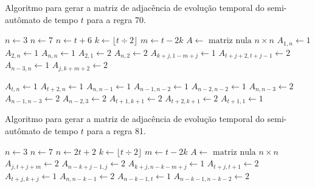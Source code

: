 \documentclass[12pt,a4paper]{article}
\begin{document}
\begin{algorithm}[H]
\caption{Algoritmo para gerar a matriz de adjacência de evolução temporal do
semi-autômato de tempo $t$ para a regra 70.}
\label{alg:r70}
\begin{algorithmic}
    \STATE $n \leftarrow 3$
\ELSE
        \STATE $n \leftarrow 7$
    \ELSE
        \STATE $n \leftarrow t+6$
    \ENDIF
\ENDIF
\STATE $k \leftarrow \lfloor t \div 2 \rfloor$
\STATE $m \leftarrow t - 2k$
\STATE $A \leftarrow \mbox{ matriz nula } n \times n$
    \STATE $A_{1,n} \leftarrow 1$
    \STATE $A_{2,n} \leftarrow 1$
    \STATE $A_{n,n} \leftarrow 1$
    \STATE $A_{2,1} \leftarrow 2$
    \STATE $A_{n,2} \leftarrow 2$
\ELSE
            \STATE $A_{k+j,1-m+j} \leftarrow 1$
        \ENDFOR
            \STATE $A_{t+j+2,t+j-1} \leftarrow 2$
        \ENDFOR
        \STATE $A_{n-3,n} \leftarrow 1$
    \ENDIF
        \STATE $A_{j,k+m+2} \leftarrow 2$
    \ENDFOR
{}
\end{algorithmic}
\end{algorithm}

\begin{algorithm}[H]
\begin{algorithmic}
    \STATE $A_{t,n} \leftarrow 1$
    \STATE $A_{t+2,n} \leftarrow 1$
    \STATE $A_{n,n-1} \leftarrow 1$
    \STATE $A_{n-1,n-2} \leftarrow 1$
    \STATE $A_{n-2,n-2} \leftarrow 1$
        \STATE $A_{n,n-3} \leftarrow 2$
        \STATE $A_{n-1,n-3} \leftarrow 2$
        \STATE $A_{n-2,3} \leftarrow 2$
    \ENDIF
    \STATE $A_{t+1,k+1} \leftarrow 2$
    \STATE $A_{t+2,k+1} \leftarrow 2$
    \STATE $A_{t+1,1} \leftarrow 1$
\ENDIF
\end{algorithmic}
\end{algorithm}

\begin{algorithm}[H]
\caption{Algoritmo para gerar a matriz de adjacência de evolução temporal do
semi-autômato de tempo $t$ para a regra 81.}
\label{alg:r81}
\begin{algorithmic}
    \STATE $n \leftarrow 3$
\ELSE
        \STATE $n \leftarrow 7$
    \ELSE
        \STATE $n \leftarrow 2t+2$
    \ENDIF
\ENDIF
\STATE $k \leftarrow \lfloor t \div 2 \rfloor$
\STATE $m \leftarrow t - 2k$
\STATE $A \leftarrow \mbox{ matriz nula } n \times n$
        \STATE $A_{j,t+j+m} \leftarrow 2$
        \STATE $A_{n-k+j-1,j} \leftarrow 2$
    \ENDFOR
\ENDIF
{}
    \STATE $A_{k+j,n-k-m+j} \leftarrow 1$
    \STATE $A_{t+j,t+1} \leftarrow 2$
    \STATE $A_{t+j,k+j} \leftarrow 1$
\ENDFOR
\STATE $A_{n,n-k-1} \leftarrow 2$
    \STATE $A_{n-k-1,t} \leftarrow 1$
    \STATE $A_{n-k-1,n-k-2} \leftarrow 2$
\ENDIF
\end{algorithmic}
\end{algorithm}
\end{document}
